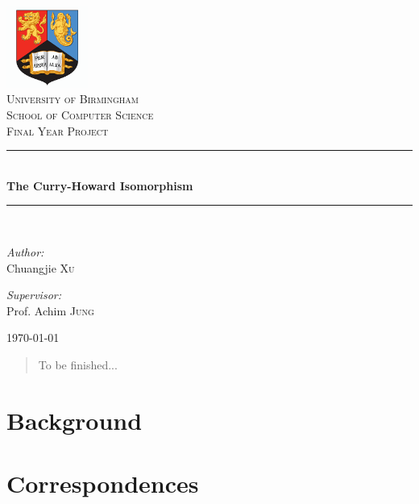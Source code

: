 \documentclass[12pt,a4paper]{article}
\theoremstyle{definition}
\theoremstyle{plain}
\theoremstyle{plain}
\begin{document}
\begin{titlepage}
\begin{center}
\includegraphics[width=0.2\textwidth]{./images/bham_logo}\\[1cm]
\textsc{\LARGE University of Birmingham}\\[0.5cm]
\textsc{\Large School of Computer Science}\\[1.5cm]
\textsc{\large Final Year Project}\\[0.3cm]
\rule{\linewidth}{0.5mm} \\[0.6cm]
{ \huge \bfseries The Curry-Howard Isomorphism}\\[0.1cm]
\rule{\linewidth}{0.5mm} \\[1.5cm]
\begin{minipage}{0.4\textwidth}
\begin{flushleft} \large
\emph{Author:}\\
Chuangjie \textsc{Xu}
\end{flushleft}
\end{minipage}
\begin{minipage}{0.4\textwidth}
\begin{flushright} \large
\emph{Supervisor:} \\
Prof. Achim \textsc{Jung}
\end{flushright}
\end{minipage}
\vfill
{\large \today}
\end{center}
\end{titlepage}

\begin{abstract}
To be finished...
\end{abstract}

\newpage
\tableofcontents



\newpage
\section{Background}




\newpage
\section{Correspondences}




\newpage


\nocite{*}
\end{document}
